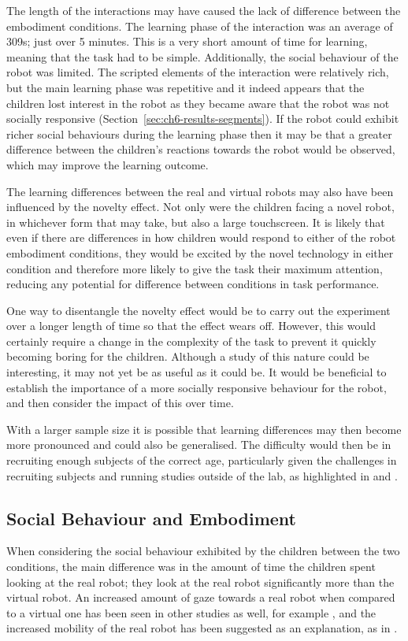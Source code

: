 The length of the interactions may have caused the lack of difference between the embodiment conditions. The learning phase of the interaction was an average of 309s; just over 5 minutes. This is a very short amount of time for learning, meaning that the task had to be simple. Additionally, the social behaviour of the robot was limited. The scripted elements of the interaction were relatively rich, but the main learning phase was repetitive and it indeed appears that the children lost interest in the robot as they became aware that the robot was not socially responsive (Section~\ref{sec:ch6-results-segments}). If the robot could exhibit richer social behaviours during the learning phase then it may be that a greater difference between the children's reactions towards the robot would be observed, which may improve the learning outcome.

The learning differences between the real and virtual robots may also have been influenced by the novelty effect. Not only were the children facing a novel robot, in whichever form that may take, but also a large touchscreen. It is likely that even if there are differences in how children would respond to either of the robot embodiment conditions, they would be excited by the novel technology in either condition and therefore more likely to give the task their maximum attention, reducing any potential for difference between conditions in task performance.

One way to disentangle the novelty effect would be to carry out the experiment over a longer length of time so that the effect wears off. However, this would certainly require a change in the complexity of the task to prevent it quickly becoming boring for the children. Although a study of this nature could be interesting, it may not yet be as useful as it could be. It would be beneficial to establish the importance of a more socially responsive behaviour for the robot, and then consider the impact of this over time.

With a larger sample size it is possible that learning differences may then become more pronounced and could also be generalised. The difficulty would then be in recruiting enough subjects of the correct age, particularly given the challenges in recruiting subjects and running studies outside of the lab, as highlighted in \cite{ros2011child} and \cite{walters2005practical}.

\subsection{Social Behaviour and Embodiment}\label{sec:ch6-disc-social}
When considering the social behaviour exhibited by the children between the two conditions, the main difference was in the amount of time the children spent looking at the real robot; they look at the real robot significantly more than the virtual robot. An increased amount of gaze towards a real robot when compared to a virtual one has been seen in other studies as well, for example \cite{looije2012help}, and the increased mobility of the real robot has been suggested as an explanation, as in \cite{breazeal2004social}.

